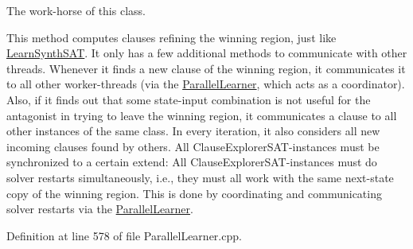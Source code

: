 The work-\/horse of this class. 

This method computes clauses refining the winning region, just like \hyperlink{classLearnSynthSAT}{Learn\-Synth\-S\-A\-T}. It only has a few additional methods to communicate with other threads. Whenever it finds a new clause of the winning region, it communicates it to all other worker-\/threads (via the \hyperlink{classParallelLearner}{Parallel\-Learner}, which acts as a coordinator). Also, if it finds out that some state-\/input combination is not useful for the antagonist in trying to leave the winning region, it communicates a clause to all other instances of the same class. In every iteration, it also considers all new incoming clauses found by others. All Clause\-Explorer\-S\-A\-T-\/instances must be synchronized to a certain extend\-: All Clause\-Explorer\-S\-A\-T-\/instances must do solver restarts simultaneously, i.\-e., they must all work with the same next-\/state copy of the winning region. This is done by coordinating and communicating solver restarts via the \hyperlink{classParallelLearner}{Parallel\-Learner}. 

Definition at line 578 of file Parallel\-Learner.\-cpp.



